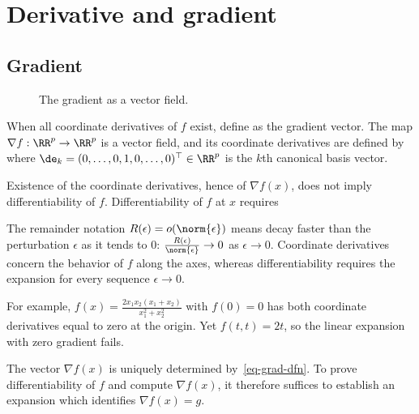 \section{Derivative and gradient}

                                                                                  
\subsection{Gradient}


\begin{figure}[tbp]
\centering
{}
\caption{The gradient as a vector field.}
\label{fig-review-smooth-gradient-field}
\end{figure}
When all coordinate derivatives of $f$ exist, define
as the gradient vector. The map $\nabla f : \RR^p \rightarrow \RR^p$ is a vector field, and its coordinate derivatives are defined by
where $\de_k=(0,\ldots,0,1,0,\ldots,0)^\top \in \RR^p$ is the $k$th canonical basis vector.

Existence of the coordinate derivatives, hence of $\nabla f(x)$, does not imply differentiability of $f$. Differentiability of $f$ at $x$ requires
 
The remainder notation $R(\epsilon) = o(\norm{\epsilon})$ means decay faster than the perturbation $\epsilon$ as it tends to $0$: $\frac{R(\epsilon)}{\norm{\epsilon}} \rightarrow 0$ as $\epsilon \rightarrow 0$. Coordinate derivatives concern the behavior of $f$ along the axes, whereas differentiability requires the expansion for every sequence $\epsilon\rightarrow 0$.
 
For example, $f(x)=\frac{2 x_1 x_2 (x_1+x_2)}{x_1^2+x_2^2}$ with $f(0)=0$ has both coordinate derivatives equal to zero at the origin. Yet $f(t,t)=2t$, so the linear expansion with zero gradient fails.

The vector $\nabla f(x)$ is uniquely determined by~\eqref{eq-grad-dfn}. To prove differentiability of $f$ and compute $\nabla f(x)$, it therefore suffices to establish an expansion
which identifies $\nabla f(x)=g$.

